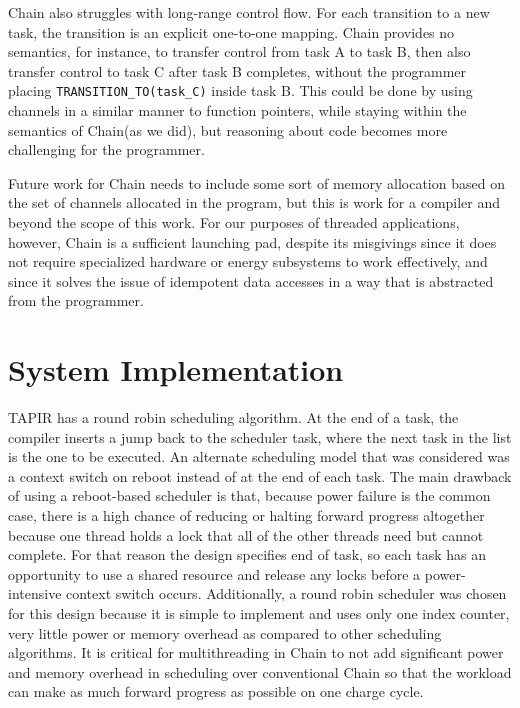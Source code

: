 \documentclass[11pt]{sensys-proc}
\newcommand{\chain}{Chain\xspace}
\begin{document}
\chain also struggles with long-range control flow. For each transition to a
new task, the transition is an explicit one-to-one mapping. \chain provides no
semantics, for instance, to transfer control from task A to task B, then also
transfer control to task C after task B completes, without the programmer
placing \texttt{TRANSITION\_TO(task\_C)} inside task B. This could be done by
using channels in a similar manner to function pointers, while staying within
the semantics of \chain (as we did), but reasoning about code becomes more
challenging for the programmer.


Future work for \chain needs to include some sort of memory allocation based on
the set of channels allocated in the program, but this is work for a compiler
and beyond the scope of this work. For our purposes of threaded applications,
however, \chain is a sufficient launching pad, despite its misgivings since it
does not require specialized hardware or energy subsystems to work effectively,
and since it solves the issue of idempotent data accesses in a way that is
abstracted from the programmer.


\section{System Implementation } %
TAPIR has a round robin scheduling algorithm. At the end of a task, the compiler
inserts a jump back to the scheduler task, where the next task in the list is
the one to be executed. An alternate scheduling model that was considered was
a context switch on reboot instead of at the end of each task. The main drawback
of using a reboot-based scheduler is that, because power failure is the common
case, there is a high chance of reducing or halting forward progress altogether
because one thread holds a lock that all of the other threads need but cannot
complete. For that reason the design specifies end of task, so each task has
an opportunity to use a shared resource and release any locks before a power-
intensive context switch occurs. Additionally, a round robin scheduler was
chosen for this design because it is simple to implement and uses only one index counter,
very little power or memory overhead as compared to other scheduling algorithms. It is
critical for multithreading in Chain to not add significant power and memory
overhead in scheduling over conventional Chain so that the workload can
make as much forward progress as possible on one charge cycle.
\end{document}
